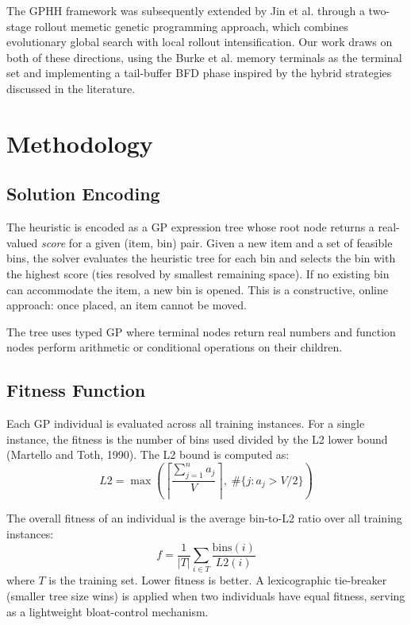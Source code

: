 \documentclass[conference]{IEEEtran}
\begin{document}
The GPHH framework was subsequently extended by Jin et al. through a two-stage rollout memetic genetic programming approach, which combines evolutionary global search with local rollout intensification. Our work draws on both of these directions, using the Burke et al. memory terminals as the terminal set and implementing a tail-buffer BFD phase inspired by the hybrid strategies discussed in the literature.


\section{Methodology}

\subsection{Solution Encoding}

The heuristic is encoded as a GP expression tree whose root node returns a real-valued \emph{score} for a given (item, bin) pair. Given a new item and a set of feasible bins, the solver evaluates the heuristic tree for each bin and selects the bin with the highest score (ties resolved by smallest remaining space). If no existing bin can accommodate the item, a new bin is opened. This is a constructive, online approach: once placed, an item cannot be moved.

The tree uses typed GP where terminal nodes return real numbers and function nodes perform arithmetic or conditional operations on their children.

\subsection{Fitness Function}

Each GP individual is evaluated across all training instances. For a single instance, the fitness is the number of bins used divided by the L2 lower bound (Martello and Toth, 1990). The L2 bound is computed as:
\begin{equation}
L2 = \max\left(\left\lceil\frac{\sum_{j=1}^{n} a_j}{V}\right\rceil,\; \#\{j : a_j > V/2\}\right)
\end{equation}

The overall fitness of an individual is the average bin-to-L2 ratio over all training instances:
\begin{equation}
f = \frac{1}{|T|}\sum_{i \in T} \frac{\text{bins}(i)}{L2(i)}
\end{equation}
where $T$ is the training set. Lower fitness is better. A lexicographic tie-breaker (smaller tree size wins) is applied when two individuals have equal fitness, serving as a lightweight bloat-control mechanism.
\end{document}
